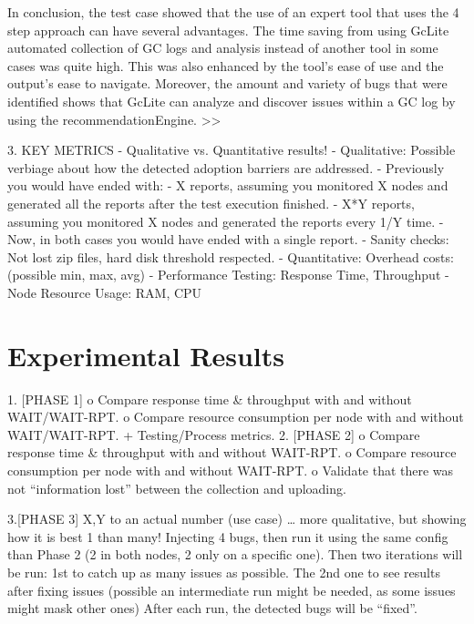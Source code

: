 \documentclass[runningheads,a4paper]{llncs}
\begin{document}
In conclusion, the test case showed that the use of an expert
tool that uses the 4 step approach can have several advantages. The time saving from 
using GcLite automated collection of GC logs and analysis instead of another tool in 
some cases was quite high. This was also enhanced by the tool’s ease of use and the 
output’s ease to navigate. Moreover, the amount and variety of bugs that were identified 
shows that GcLite can analyze and discover issues within a GC log by using the 
recommendationEngine. 
>>

3.	KEY METRICS
- Qualitative vs. Quantitative results!
- Qualitative: Possible verbiage about how the detected adoption barriers are
addressed.
- Previously you would have ended with:
- X reports, assuming you monitored X nodes and generated all the reports after
the test execution finished.
- X*Y reports, assuming you monitored X nodes and generated the reports every
1/Y time.
- Now, in both cases you would have ended with a single report.
- Sanity checks: Not lost zip files, hard disk threshold respected.
- Quantitative: Overhead costs: (possible min, max, avg)
- Performance Testing: Response Time, Throughput
- Node Resource Usage: RAM, CPU



\section{Experimental Results}



1.	[PHASE 1]
o	Compare response time \& throughput with and without WAIT/WAIT-RPT.
o	Compare resource consumption per node with and without WAIT/WAIT-RPT.
+ Testing/Process metrics.
2.	[PHASE 2]
o	Compare response time \& throughput with and without WAIT-RPT.
o	Compare resource consumption per node with and without WAIT-RPT.
o	Validate that there was not “information lost” between the collection and uploading.

3.[PHASE 3]
X,Y to an actual number (use case) … more qualitative, but showing how it is best 1 than many!
Injecting 4 bugs, then run it using the same config than Phase 2 (2 in both nodes, 2 only on a specific one). Then two iterations will be run: 1st to catch up as many issues as possible. The 2nd one to see results after fixing issues (possible an intermediate run might be needed, as some issues might mask other ones) After each run, the detected bugs will be “fixed”.
\end{document}
